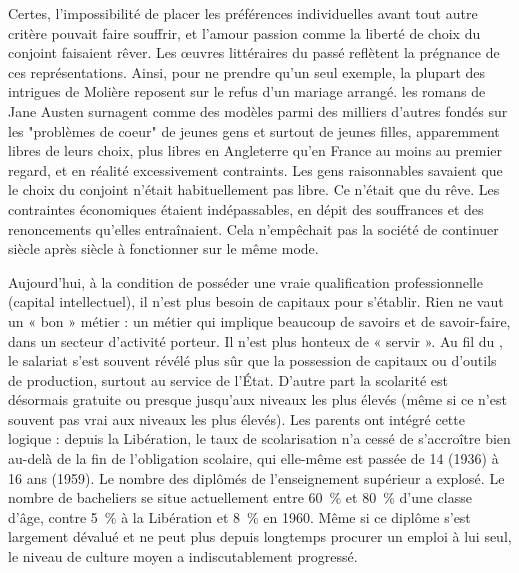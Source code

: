  Certes, l'impossibilité de placer les préférences individuelles avant tout autre critère pouvait faire souffrir, et l'amour passion comme la liberté de choix du conjoint faisaient rêver. Les œuvres littéraires du passé reflètent la prégnance de ces représentations. Ainsi, pour ne prendre qu'un seul exemple, la plupart des intrigues de Molière reposent sur le refus d'un mariage arrangé. les romans de Jane Austen surnagent comme des modèles parmi des milliers d'autres fondés sur les "problèmes de coeur" de jeunes gens et surtout de jeunes filles, apparemment libres de leurs choix, plus libres en Angleterre qu'en France au moins au premier regard, et en réalité excessivement contraints. Les gens raisonnables savaient que le choix du conjoint n'était habituellement pas libre. Ce n'était que du rêve. Les contraintes économiques étaient indépassables, en dépit des souffrances et des renoncements qu'elles entraînaient. Cela n'empêchait pas la société de continuer siècle après siècle à fonctionner sur le même mode. 

 Aujourd'hui, à la condition de posséder une vraie qualification professionnelle (capital intellectuel), il n'est plus besoin de capitaux pour s'établir. Rien ne vaut un « bon » métier : un métier qui implique beaucoup de savoirs et de savoir-faire, dans un secteur d'activité porteur. Il n'est plus honteux de « servir ». Au fil du , le salariat s'est souvent révélé plus sûr que la possession de capitaux ou d'outils de production, surtout au service de l'État. D'autre part la scolarité est désormais gratuite ou presque jusqu'aux niveaux les plus élevés (même si ce n'est souvent pas vrai aux niveaux les plus élevés). Les parents ont intégré cette logique : depuis la Libération, le taux de scolarisation n'a cessé de s'accroître bien au-delà de la fin de l'obligation scolaire, qui elle-même est passée de 14 (1936) à 16 ans (1959). Le nombre des diplômés de l'enseignement supérieur a explosé. Le nombre de bacheliers se situe actuellement entre 60~\% et 80~\% d'une classe d'âge, contre 5~\% à la Libération et 8~\% en 1960. Même si ce diplôme s'est largement dévalué et ne peut plus depuis longtemps procurer un emploi à lui seul, le niveau de culture moyen a indiscutablement progressé. 

